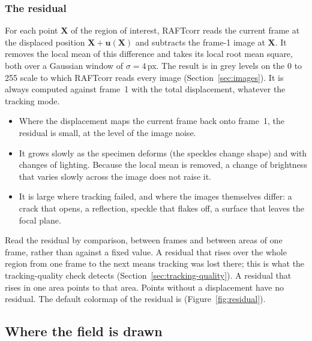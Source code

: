 \subsubsection*{The residual}
\label{sec:residual}

For each point $\mathbf{X}$ of the region of interest, RAFTcorr reads the current frame at the
displaced position $\mathbf{X} + \mathbf{u}(\mathbf{X})$ and subtracts the frame-1 image at
$\mathbf{X}$. It removes the local mean of this difference and takes its local root mean square,
both over a Gaussian window of $\sigma = 4$\,px. The result is in grey levels on the 0 to 255
scale to which RAFTcorr reads every image (Section~\ref{sec:images}). It is always computed
against frame~1 with the total displacement, whatever the tracking mode.

\begin{itemize}
  \item Where the displacement maps the current frame back onto frame~1, the residual is small,
        at the level of the image noise.
  \item It grows slowly as the specimen deforms (the speckles change shape) and with changes of
        lighting. Because the local mean is removed, a change of brightness that varies slowly
        across the image does not raise it.
  \item It is large where tracking failed, and where the images themselves differ: a crack that
        opens, a reflection, speckle that flakes off, a surface that leaves the focal plane.
\end{itemize}

Read the residual by comparison, between frames and between areas of one frame, rather than
against a fixed value. A residual that rises over the whole region from one frame to the next
means tracking was lost there; this is what the tracking-quality check detects
(Section~\ref{sec:tracking-quality}). A residual that rises in one area points to that area.
Points without a displacement have no residual. The default colormap of the residual is
 (Figure~\ref{fig:residual}).


\subsection{Where the field is drawn}

